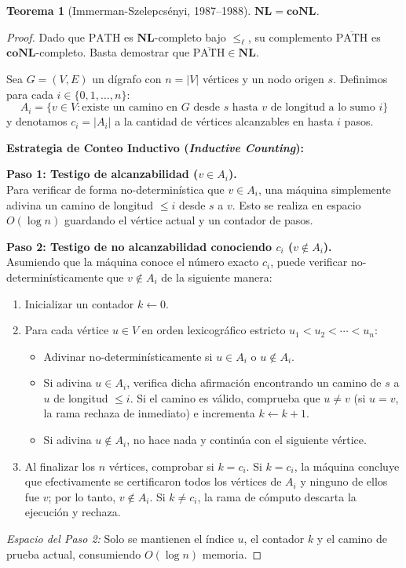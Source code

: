 \documentclass[11pt, a4paper]{article}
\theoremstyle{definition}
\theoremstyle{plain}
\newtheorem{teorema}[definicion]{Teorema}
\theoremstyle{remark}
\newcommand{\classNL}{\mathbf{NL}}
\newcommand{\classcoNL}{\mathbf{coNL}}
\newcommand{\PATH}{\text{PATH}}
\newcommand{\coPATH}{\overline{\text{PATH}}}
\newcommand{\leL}{\le_\ell}
\begin{document}
\begin{teorema}[Immerman-Szelepcsényi, 1987--1988]
$\classNL = \classcoNL$.
\end{teorema}

\begin{proof}
Dado que $\PATH$ es $\classNL$-completo bajo $\leL$, su complemento $\coPATH$ es $\classcoNL$-completo. Basta demostrar que $\coPATH \in \classNL$.

Sea $G = (V, E)$ un dígrafo con $n = |V|$ vértices y un nodo origen $s$.
Definimos para cada $i \in \{0, 1, \dots, n\}$:
\[
A_i = \{v \in V : \text{existe un camino en } G \text{ desde } s \text{ hasta } v \text{ de longitud a lo sumo } i\}
\]
y denotamos $c_i = |A_i|$ a la cantidad de vértices alcanzables en hasta $i$ pasos.

\vspace{0.5em}
\noindent\textbf{Estrategia de Conteo Inductivo (\textit{Inductive Counting}):}

\vspace{0.5em}
\noindent\textbf{Paso 1: Testigo de alcanzabilidad ($v \in A_i$).}\\
Para verificar de forma no-determinística que $v \in A_i$, una máquina simplemente adivina un camino de longitud $\le i$ desde $s$ a $v$. Esto se realiza en espacio $O(\log n)$ guardando el vértice actual y un contador de pasos.

\vspace{0.5em}
\noindent\textbf{Paso 2: Testigo de no alcanzabilidad conociendo $c_i$ ($v \notin A_i$).}\\
Asumiendo que la máquina conoce el número exacto $c_i$, puede verificar no-determinísticamente que $v \notin A_i$ de la siguiente manera:
\begin{enumerate}[label=\alph*.]
    \item Inicializar un contador $k \leftarrow 0$.
    \item Para cada vértice $u \in V$ en orden lexicográfico estricto $u_1 < u_2 < \cdots < u_n$:
    \begin{itemize}
        \item Adivinar no-determinísticamente si $u \in A_i$ o $u \notin A_i$.
        \item Si adivina $u \in A_i$, verifica dicha afirmación encontrando un camino de $s$ a $u$ de longitud $\le i$. Si el camino es válido, comprueba que $u \neq v$ (si $u = v$, la rama rechaza de inmediato) e incrementa $k \leftarrow k + 1$.
        \item Si adivina $u \notin A_i$, no hace nada y continúa con el siguiente vértice.
    \end{itemize}
    \item Al finalizar los $n$ vértices, comprobar si $k = c_i$. Si $k = c_i$, la máquina concluye que efectivamente se certificaron todos los vértices de $A_i$ y ninguno de ellos fue $v$; por lo tanto, $v \notin A_i$. Si $k \neq c_i$, la rama de cómputo descarta la ejecución y rechaza.
\end{enumerate}
\textit{Espacio del Paso 2:} Solo se mantienen el índice $u$, el contador $k$ y el camino de prueba actual, consumiendo $O(\log n)$ memoria.


\end{proof}
\end{document}
